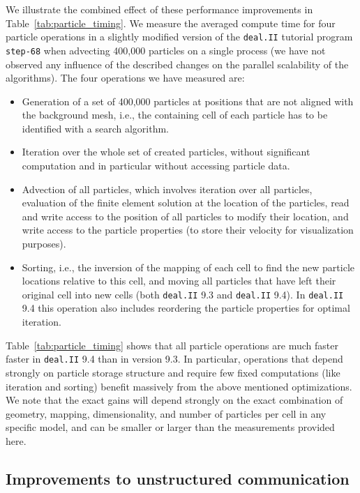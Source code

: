 \documentclass{ansarticle-preprint}
\newcommand{\specialword}[1]{\texttt{#1}}
\newcommand{\dealii}{{\specialword{deal.II}}\xspace}
\begin{document}
We illustrate the combined effect of these performance improvements in Table~\ref{tab:particle_timing}. We measure the averaged compute time for four particle operations in a slightly modified version of the \dealii tutorial program \texttt{step-68} when advecting 400,000 particles on a single process (we have not observed any influence of the described changes on the parallel scalability of the algorithms).
The four operations we have measured are:
\begin{itemize}
\item Generation of a set of 400,000 particles at positions that are not aligned with the background mesh, i.e., the containing cell of each particle has to be identified with a search algorithm.
\item Iteration over the whole set of created particles, without
  significant computation and in particular without accessing particle data.
\item Advection of all particles, which involves iteration over all particles, evaluation of the finite element solution at the location of the particles, read and write access to the position of all particles to modify their location, and write access to the particle properties (to store their velocity for visualization purposes).
\item Sorting, i.e., the inversion of the mapping of each cell to find the new particle locations relative to this cell, and moving all particles that have left their original cell into new cells (both \dealii 9.3 and \dealii 9.4). In \dealii 9.4 this operation also includes reordering the particle properties for optimal iteration.
\end{itemize}

Table~\ref{tab:particle_timing} shows that all particle operations are
much faster faster in \dealii 9.4 than in version 9.3. In particular, operations that depend strongly on particle storage structure and require few fixed computations (like iteration and sorting) benefit massively from the above mentioned optimizations. We note that the exact gains will depend strongly on the exact combination of geometry, mapping, dimensionality, and number of particles per cell in any specific model, and can be smaller or larger than the measurements provided here.


\subsection{Improvements to unstructured communication}
\label{sec:CA}
\end{document}

